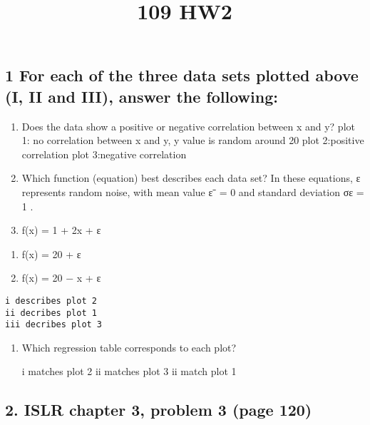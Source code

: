\documentclass[11pt]{article}
\title{109 HW2}
\providecommand{\tightlist}{%
      \setlength{\itemsep}{0pt}\setlength{\parskip}{0pt}}
\begin{document}
    
    
    \maketitle
    
    

    
    \hypertarget{for-each-of-the-three-data-sets-plotted-above-i-ii-and-iii-answer-the-following}{%
\subsection{1 For each of the three data sets plotted above (I, II and
III), answer the
following:}\label{for-each-of-the-three-data-sets-plotted-above-i-ii-and-iii-answer-the-following}}

\begin{enumerate}
\def\labelenumi{\alph{enumi}.}
\item
  Does the data show a positive or negative correlation between x and y?
  plot 1: no correlation between x and y, y value is random around 20
  plot 2:positive correlation plot 3:negative correlation
\item
  Which function (equation) best describes each data set? In these
  equations, ε represents random noise, with mean value εˉ = 0 and
  standard deviation σε = 1 .
\item
  f(x) = 1 + 2x + ε
\end{enumerate}

\begin{enumerate}
\def\labelenumi{\roman{enumi}.}
\setcounter{enumi}{1}
\tightlist
\item
  f(x) = 20 + ε
\item
  f(x) = 20 − x + ε
\end{enumerate}

\begin{verbatim}
i describes plot 2
ii decribes plot 1
iii decribes plot 3
\end{verbatim}

\begin{enumerate}
\def\labelenumi{\alph{enumi}.}
\setcounter{enumi}{2}
\item
  Which regression table corresponds to each plot?

  i matches plot 2 ii matches plot 3 ii match plot 1
\end{enumerate}

    \hypertarget{islr-chapter-3-problem-3-page-120}{%
\subsection{2. ISLR chapter 3, problem 3 (page
120)}\label{islr-chapter-3-problem-3-page-120}}
\end{document}
